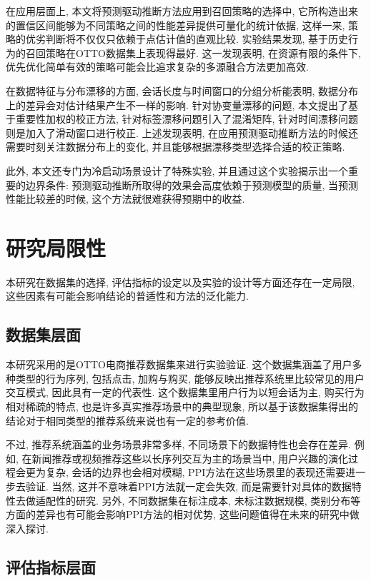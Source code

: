 \documentclass[a4paper, AutoFakeBold, UTF8]{ctexrep}
\theoremstyle{plain}
\numberwithin{equation}{chapter}
\begin{document}
在应用层面上, 本文将预测驱动推断方法应用到召回策略的选择中, 它所构造出来的置信区间能够为不同策略之间的性能差异提供可量化的统计依据, 这样一来, 策略的优劣判断将不仅仅只依赖于点估计值的直观比较. 实验结果发现, 基于历史行为的召回策略在OTTO数据集上表现得最好. 这一发现表明, 在资源有限的条件下, 优先优化简单有效的策略可能会比追求复杂的多源融合方法更加高效. 

在数据特征与分布漂移的方面, 会话长度与时间窗口的分组分析能表明, 数据分布上的差异会对估计结果产生不一样的影响. 针对协变量漂移的问题, 本文提出了基于重要性加权的校正方法, 针对标签漂移问题引入了混淆矩阵, 针对时间漂移问题则是加入了滑动窗口进行校正. 上述发现表明, 在应用预测驱动推断方法的时候还需要时刻关注数据分布上的变化, 并且能够根据漂移类型选择合适的校正策略. 

此外, 本文还专门为冷启动场景设计了特殊实验, 并且通过这个实验揭示出一个重要的边界条件: 预测驱动推断所取得的效果会高度依赖于预测模型的质量, 当预测性能比较差的时候, 这个方法就很难获得预期中的收益. 

\section{研究局限性}

本研究在数据集的选择, 评估指标的设定以及实验的设计等方面还存在一定局限, 这些因素有可能会影响结论的普适性和方法的泛化能力. 

\subsection{数据集层面}

本研究采用的是OTTO电商推荐数据集来进行实验验证. 这个数据集涵盖了用户多种类型的行为序列, 包括点击, 加购与购买, 能够反映出推荐系统里比较常见的用户交互模式, 因此具有一定的代表性. 这个数据集里用户行为以短会话为主, 购买行为相对稀疏的特点, 也是许多真实推荐场景中的典型现象, 所以基于该数据集得出的结论对于相同类型的推荐系统来说也有一定的参考价值. 

不过, 推荐系统涵盖的业务场景非常多样, 不同场景下的数据特性也会存在差异. 例如, 在新闻推荐或视频推荐这些以长序列交互为主的场景当中, 用户兴趣的演化过程会更为复杂, 会话的边界也会相对模糊, PPI方法在这些场景里的表现还需要进一步去验证. 当然, 这并不意味着PPI方法就一定会失效, 而是需要针对具体的数据特性去做适配性的研究. 另外, 不同数据集在标注成本, 未标注数据规模, 类别分布等方面的差异也有可能会影响PPI方法的相对优势, 这些问题值得在未来的研究中做深入探讨. 

\subsection{评估指标层面}
\end{document}

